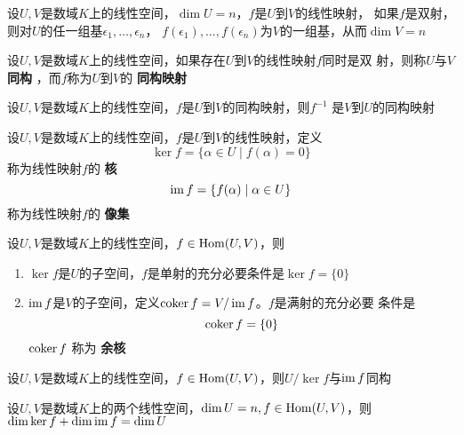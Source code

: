 \documentclass[11pt]{article}
\begin{document}
\begin{proposition}[]
设\(U,V\)是数域\(K\)上的线性空间，\(\dim U=n\)，\(f\)是\(U\)到\(V\)的线性映射，
如果\(f\)是双射，则对\(U\)的任一组基\(\epsilon_1,\dots,\epsilon_n\)，
\(f(\epsilon_1),\dots,f(\epsilon_n)\)为\(V\)的一组基，从而\(\dim V=n\)
\end{proposition}

\begin{definition}[]
设\(U,V\)是数域\(K\)上的线性空间，如果存在\(U\)到\(V\)的线性映射\(f\)同时是双
射，则称\(U\)与\(V\) \textbf{同构} ，而\(f\)称为\(U\)到\(V\)的 \textbf{同构映射}
\end{definition}
\begin{proposition}[]
设\(U,V\)是数域\(K\)上的线性空间，\(f\)是\(U\)到\(V\)的同构映射，则\(f^{-1}\)
是\(V\)到\(U\)的同构映射
\end{proposition}

\begin{definition}[]
设\(U,V\)是数域\(K\)上的线性空间，\(f\)是\(U\)到\(V\)的线性映射，定义
\begin{equation*}
\ker f=\{\alpha\in U\mid f(\alpha)=0\}
\end{equation*}
称为线性映射\(f\)的 \textbf{核}
\begin{equation*}
\operatorname{im} f=\{f(\alpha)\mid \alpha\in U\}
\end{equation*}
称为线性映射\(f\)的 \textbf{像集}
\end{definition}

\begin{proposition}[]
设\(U,V\)是数域\(K\)上的线性空间，\(f\in\operatorname{Hom}(U,V)\)，则
\begin{enumerate}
\item \(\ker f\)是\(U\)的子空间，\(f\)是单射的充分必要条件是\(\ker f=\{0\}\)
\item \(\operatorname{im} f\)是\(V\)的子空间，定义\(\operatorname{coker} f=V/\operatorname{im} f\)。\(f\)是满射的充分必要
条件是
\begin{equation*}
\operatorname{coker} f=\{0\}
\end{equation*}
\(\operatorname{coker} f\) 称为 \textbf{余核}
\end{enumerate}
\end{proposition}

\begin{proposition}[]
设\(U,V\)是数域\(K\)上的线性空间，\(f\in\operatorname{Hom}(U,V)\)，则\(U/\ker f\)与\(\operatorname{im}
   f\)同构
\end{proposition}

\begin{corollary}[]
设\(U,V\)是数域\(K\)上的两个线性空间，\(\dim U=n,f\in\operatorname{Hom}(U,V)\)，则
\(\dim\ker f+\dim\operatorname{im} f=\dim U\)
\end{corollary}
\end{document}
